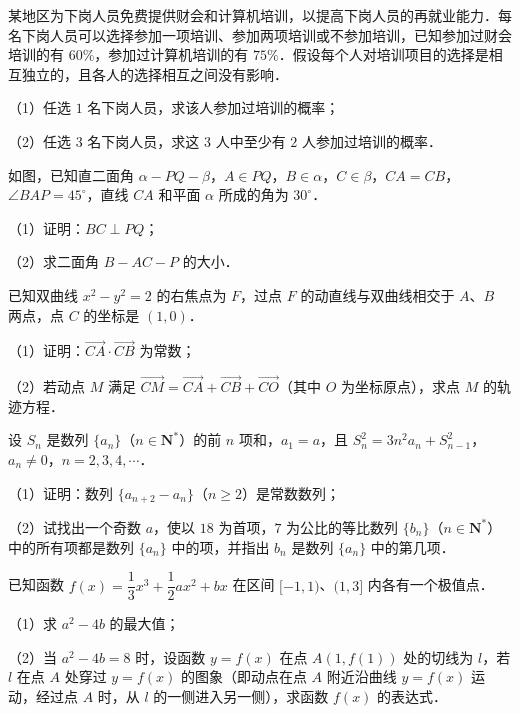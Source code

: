 \begin{question}
某地区为下岗人员免费提供财会和计算机培训，以提高下岗人员的再就业能力．每名下岗人员可以选择参加一项培训、参加两项培训或不参加培训，已知参加过财会培训的有 $60\%$，参加过计算机培训的有 $75\%$．假设每个人对培训项目的选择是相互独立的，且各人的选择相互之间没有影响．

（1）任选 $1$ 名下岗人员，求该人参加过培训的概率；

（2）任选 $3$ 名下岗人员，求这 $3$ 人中至少有 $2$ 人参加过培训的概率．

\Needspace{0.4\textheight}
\end{question}
\begin{question}
如图，已知直二面角 $\alpha-PQ-\beta$，$A\in PQ$，$B\in\alpha$，$C\in\beta$，$CA=CB$，$\angle BAP=45^\circ$，直线 $CA$ 和平面 $\alpha$ 所成的角为 $30^\circ$．
\nopagebreak[4]
\begin{center}\end{center}
\nopagebreak[4]
（1）证明：$BC\perp PQ$；

（2）求二面角 $B-AC-P$ 的大小．

\end{question}
\begin{question}
已知双曲线 $x^2-y^2=2$ 的右焦点为 $F$，过点 $F$ 的动直线与双曲线相交于 $A$、$B$ 两点，点 $C$ 的坐标是 $(1,0)$．

（1）证明：$\overrightarrow{CA}\cdot\overrightarrow{CB}$ 为常数；

（2）若动点 $M$ 满足 $\overrightarrow{CM}=\overrightarrow{CA}+\overrightarrow{CB}+\overrightarrow{CO}$（其中 $O$ 为坐标原点），求点 $M$ 的轨迹方程．

\end{question}
\begin{question}
设 $S_n$ 是数列 $\{a_n\}$（$n\in\mathbf N^*$）的前 $n$ 项和，$a_1=a$，且 $S_n^2=3n^2a_n+S_{n-1}^2$，$a_n\neq0$，$n=2,3,4,\cdots$．

（1）证明：数列 $\{a_{n+2}-a_n\}$（$n\geqslant2$）是常数数列；

（2）试找出一个奇数 $a$，使以 $18$ 为首项，$7$ 为公比的等比数列 $\{b_n\}$（$n\in\mathbf N^*$）中的所有项都是数列 $\{a_n\}$ 中的项，并指出 $b_n$ 是数列 $\{a_n\}$ 中的第几项．

\end{question}
\begin{question}
已知函数 $f(x)=\dfrac13x^3+\dfrac12ax^2+bx$ 在区间 $[-1,1)$、$(1,3]$ 内各有一个极值点．

（1）求 $a^2-4b$ 的最大值；

（2）当 $a^2-4b=8$ 时，设函数 $y=f(x)$ 在点 $A(1,f(1))$ 处的切线为 $l$，若 $l$ 在点 $A$ 处穿过 $y=f(x)$ 的图象（即动点在点 $A$ 附近沿曲线 $y=f(x)$ 运动，经过点 $A$ 时，从 $l$ 的一侧进入另一侧），求函数 $f(x)$ 的表达式．

\end{question}